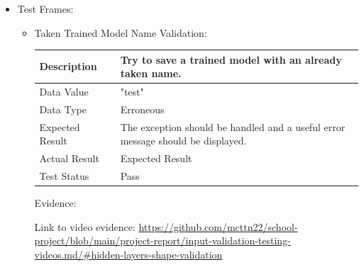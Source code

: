 \documentclass[./project-report/src/latex/project-report.tex]{subfiles}
\begin{document}
\begin{itemize}
    \item Test Frames:
    \label{sec:test-frames-input-validation}
    \begin{itemize}
        \item Taken Trained Model Name Validation: \newline\newline
			\begin{tabular}{|p{0.25\linewidth}|p{0.75\linewidth}|}
				\hline
				Description & Try to save a trained model with an already taken name. \\
				\hline
				Data Value & "test" \\
				\hline
				Data Type & Erroneous \\
				\hline
				Expected Result & The exception should be handled and a useful error message should be displayed. \\
				\hline
				Actual Result & Expected Result \\
				\hline
				Test Status & Pass \\
				\hline
			\end{tabular}

			\vspace{5mm}

            Evidence:
			\begin{figure}[h!]
			\centering
			\end{figure}

			Link to video evidence: \url{https://github.com/mcttn22/school-project/blob/main/project-report/input-validation-testing-videos.md/#hidden-layers-shape-validation}


\end{itemize}
\end{itemize}
\end{document}
